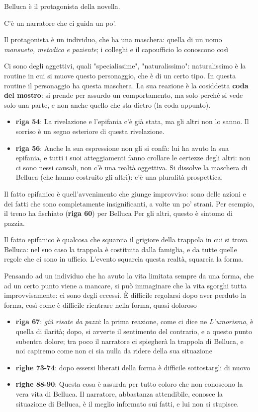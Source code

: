 \documentclass[a4paper, twoside, titlepage]{book}
\newcommand{\elenco}[1]{%
\begin{itemize}
#1
\end{itemize}}
\begin{document}
Belluca è il protagonista della novella.

C'è un narratore che ci guida un po'.

Il protagonista è un individuo, che ha una maschera: quella di un uomo \textit{mansueto, metodico e paziente}; i colleghi e il capoufficio lo conoscono così

Ci sono degli aggettivi, quali "specialissime", "naturalissimo": naturalissimo è la routine in cui si muove questo personaggio, che è di un certo tipo. In questa routine il personaggio ha questa maschera. La sua reazione è la cosiddetta \textbf{coda del mostro}: si prende per assurdo un comportamento, ma solo perché si vede solo una parte, e non anche quello che sta dietro (la coda appunto).

\elenco{\item \textbf{riga 54}: La rivelazione e l'epifania c'è già stata, ma gli altri non lo sanno. Il sorriso è un segno esteriore di questa rivelazione.
\item \textbf{riga 56}: Anche la sua espressione non gli si confà: lui ha avuto la sua epifania, e tutti i suoi atteggiamenti fanno crollare le certezze degli altri: non ci sono nessi causali, non c'è una realtà oggettiva. Si dissolve la maschera di Belluca (che hanno costruito gli altri): c'è una pluralità prospettica.
}

Il fatto epifanico è quell'avvenimento che giunge improvviso: sono delle azioni e dei fatti che sono completamente insignificanti, a volte un po' strani. Per esempio, il treno ha fischiato (\textbf{riga 60}) per Belluca
Per gli altri, questo è sintomo di pazzia.

Il fatto epifanico è qualcosa che squarcia il grigiore della trappola in cui si trova Belluca: nel suo caso la trappola è costituita dalla famiglia, e da tutte quelle regole che ci sono in ufficio. L'evento squarcia questa realtà, squarcia la forma.

Pensando ad un individuo che ha avuto la vita limitata sempre da una forma, che ad un certo punto viene a mancare, si può immaginare che la vita sgorghi tutta improvvisamente: ci sono degli eccessi.
È difficile regolarsi dopo aver perduto la forma, così come è difficile rientrare nella forma, quasi doloroso

\elenco{\item \textbf{riga 67}: \textit{giù risate da pazzi}: la prima reazione, come ci dice ne \textit{L'umorismo}, è quella di ilarità; dopo, si avverte il sentimento del contrario, e a questo punto subentra dolore; tra poco il narratore ci spiegherà la trappola di Belluca, e noi capiremo come non ci sia nulla da ridere della sua situazione
\item \textbf{righe 73-74}: dopo essersi liberati della forma è difficile sottostargli di nuovo
\item \textbf{righe 88-90}: Questa cosa è assurda per tutto coloro che non conoscono la vera vita di Belluca. Il narratore, abbastanza attendibile, conosce la situazione di Belluca, è il meglio informato sui fatti, e lui non si stupisce.
}
\end{document}

